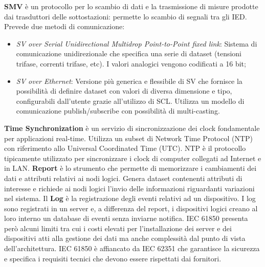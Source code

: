 \textbf{SMV} è un protocollo per lo scambio di dati e la trasmissione di misure prodotte dai trasduttori delle sottostazioni: permette lo scambio di segnali tra gli IED. Prevede due metodi di comunicazione:
\begin{itemize}
	\item\emph{SV over Serial Unidirectional Multidrop Point-to-Point fixed link}: Sistema di comunicazione unidirezionale che specifica una serie di dataset (tensioni trifase, correnti trifase, etc). I valori analogici vengono codificati a 16 bit;
	\item\emph{SV over Ethernet}: Versione più generica e flessibile di SV che fornisce la possibilità di definire dataset con valori di diversa dimensione e tipo, configurabili dall'utente grazie all'utilizzo di SCL. Utilizza un modello di comunicazione publish/subscribe con possibilità di multi-casting.
\end{itemize}
\textbf{Time Synchronization} è un servizio di sincronizzazione dei clock fondamentale per applicazioni real-time. Utilizza un subset di Network Time Protocol (NTP) con riferimento allo Universal Coordinated Time (UTC). NTP è il protocollo tipicamente utilizzato per sincronizzare i clock di computer collegati ad Internet e in LAN.\newline
\textbf{Report} è lo strumento che permette di memorizzare i cambiamenti dei dati e attributi relativi ai nodi logici. Genera dataset contenenti attributi di interesse e richiede ai nodi logici l'invio delle informazioni riguardanti variazioni nel sistema. Il \textbf{Log} è la registrazione degli eventi relativi ad un dispositivo. I log sono registrati in un server e, a differenza del report, i dispositivi logici creano al loro interno un database di eventi senza inviarne notifica.\newline
IEC 61850 presenta però alcuni limiti tra cui i costi elevati per l'installazione dei server e dei dispositivi atti alla gestione dei dati ma anche  complessità dal punto di vista dell'architettura. IEC 61850 è affiancato da IEC 62351 che garantisce la sicurezza e specifica i requisiti tecnici che devono essere rispettati dai fornitori.
\newpage

